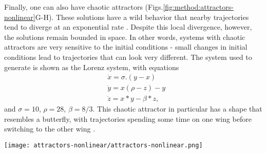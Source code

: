 Finally, one can also have chaotic attractors (Figs.\ref{fig:method:attractors-nonlinear}G-H). These solutions have a wild behavior that nearby trajectories tend to diverge at an exponential rate \cite{}. Despite this local divergence, however, the solutions remain bounded in space. 
In other words, systems with chaotic attractors are very sensitive to the initial conditions - small changes in initial conditions lead to trajectories that can look very different.  
The system used to generate is shown as the Lorenz system, with equations 
%
\begin{align}
    &\dot{x} = \sigma. (y-x) \\ 
    &\dot{y} = x(\rho-z) - y \\ 
    &\dot{z} = x*y -\beta*z,
    \label{eq:lorenz}
\end{align}
and $\sigma = 10$, $\rho = 28$, $\beta = 8/3$. This chaotic attractor in particular has a shape that resembles a butterfly, with trajectories spending some time on one wing before switching to the other wing \cite{argyrisbook}. 



\begin{figure*}[htb!]
    \centering 
    \texttt{[image: attractors-nonlinear/attractors-nonlinear.png]}
    \caption{Basic types of attractors in nonlinear dynamical systems. Each column shows respectively the state space and a time-series of a typical trajectory converging to a type of attractor. The first column corresponds to the neuronal model of Eq.\ref{eq:inapk} with $I=2.0$, which has excitable dynamics, converging to a stable equilibrium. The second column shows again the neuronal system of Eq.\ref{eq:inapk} but with $I=6.0$, when the attractor is now a stable limit cycle. The third column shows the system defined in Eqs.\ref{eq:vanderpol}, with a quasiperiodic attractor Finally, column four has an example of a chaotic trajectory on the Lorenz system (Eq.~\ref{eq:lorenz}).}
    \label{fig:method:attractors-nonlinear}    
\end{figure*}



